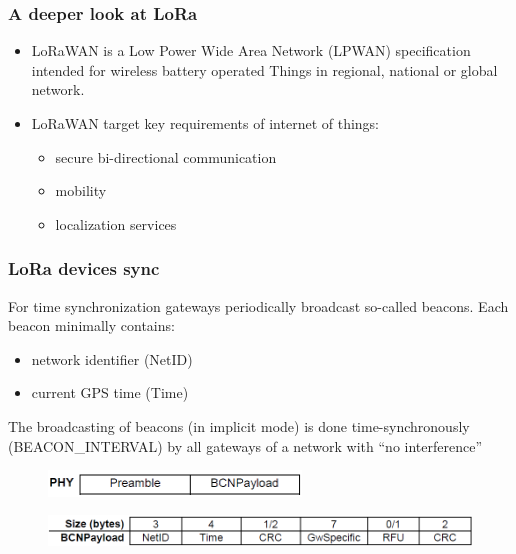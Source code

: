 \begin{frame}[fragile]
  \frametitle{A deeper look at LoRa}
  \begin{itemize}
      \item LoRaWAN is a Low Power Wide Area Network (LPWAN) specification intended for wireless battery operated Things in regional, national or global network. 
      \item LoRaWAN target key requirements of internet of things:
      \begin{itemize}
      	\item secure bi-directional communication
      	\item mobility
      	\item localization services 
      \end{itemize}
  \end{itemize}
\end{frame}

\begin{frame}[fragile]
  \frametitle{LoRa devices sync}
  For time synchronization gateways periodically broadcast so-called beacons. Each beacon
  minimally contains:
  \begin{itemize}
      \item network identifier (NetID)
      \item current GPS time (Time)
      \end{itemize}
      The broadcasting of beacons (in implicit mode) is done time-synchronously (BEACON\_INTERVAL) by all gateways of a network with \textquotedblleft no interference\textquotedblright
      \begin{figure}
  \centering
  \includegraphics[width=0.6\textwidth]{img/general_lora_beaconing.png}
\end{figure}
  \begin{figure}
  	\centering
  \includegraphics[width=\textwidth]{img/lora_beaconing.png}
  \end{figure}
\end{frame}

